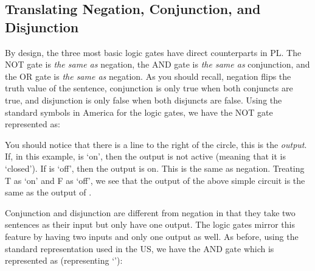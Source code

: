 \subsection{Translating Negation, Conjunction, and Disjunction}

By design, the three most basic logic gates have direct counterparts in PL. The NOT gate is \emph{the same as} negation, the AND gate is \emph{the same as} conjunction, and the OR gate is \emph{the same as} negation. As you should recall, negation flips the truth value of the sentence, conjunction is only true when both conjuncts are true, and disjunction is only false when both disjuncts are false. Using the standard symbols in America for the logic gates, we have the NOT gate represented as:


You should notice that there is a line to the right of the circle, this is the \emph{output}. If, in this example,  is `on', then the output is not active (meaning that it is `closed'). If  is `off', then the output is on. This is the same as negation. Treating T as `on' and F as `off', we see that the output of the above simple circuit is the same as the output of \enot{}. 

Conjunction and disjunction are different from negation in that they take two sentences as their input but only have one output. The logic gates mirror this feature by having two inputs and only one output as well. As before, using the standard representation used in the US, we have the AND gate which is represented as (representing `\eand{}'):


